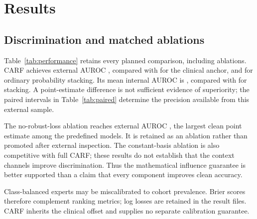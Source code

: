 \documentclass[runningheads]{llncs}
\begin{document}
\section{Results}
\subsection{Discrimination and matched ablations}
\begin{table}[t]
\centering\caption{Matched comparisons. Internal AUC is the mean over 25 outer folds; external metrics use 112 I-SPY1 participants. AP denotes average precision.}
\small\setlength{\tabcolsep}{4pt}
\label{tab:performance}
\end{table}
Table~\ref{tab:performance} retains every planned comparison, including ablations. CARF achieves external AUROC \CarfAuc{}, compared with \AnchorAuc{} for the clinical anchor, and \StackAuc{} for ordinary probability stacking. Its mean internal AUROC is \CarfInternal{}, compared with \StackInternal{} for stacking. A point-estimate difference is not sufficient evidence of superiority; the paired intervals in Table~\ref{tab:paired} determine the precision available from this external sample.

\begin{table}[t]
\centering\caption{Paired external AUROC differences, CARF minus comparator. Percentile intervals use 2,000 patient bootstrap resamples and are conditional on the fitted predictors.}

\label{tab:paired}
\end{table}
The no-robust-loss ablation reaches external AUROC \NoRobustAuc{}, the largest clean point estimate among the predefined models. It is retained as an ablation rather than promoted after external inspection. The constant-basis ablation is also competitive with full CARF; these results do not establish that the context channels improve discrimination. Thus the mathematical influence guarantee is better supported than a claim that every component improves clean accuracy.

Class-balanced experts may be miscalibrated to cohort prevalence. Brier scores therefore complement ranking metrics; log losses are retained in the result files. CARF inherits the clinical offset and supplies no separate calibration guarantee.
\end{document}
